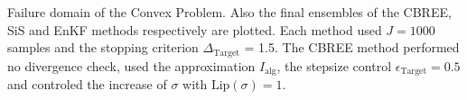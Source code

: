 Failure domain of the Convex Problem. Also the final ensembles of the CBREE, SiS and EnKF methods respectively are plotted. Each method used $J=1000$ samples and the stopping criterion $\Delta_{\text{Target}}$ = 1.5. The CBREE method performed no divergence check, used the approximation $I_\text{alg}$, the stepsize control $\epsilon_{\text{Target}}=0.5$ and controled the increase of $\sigma$ with $\text{Lip}(\sigma) = 1$.